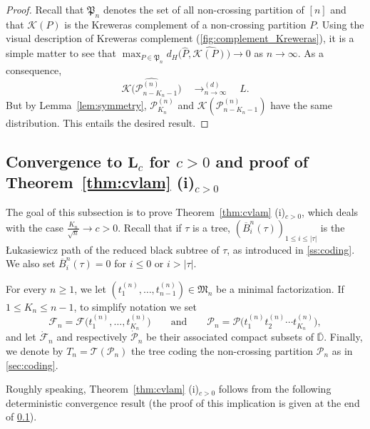 \documentclass[AHL,XML,longabstracts,Unicode]{cedram}
\newcommand{\D}{\mathbb{D}}
\def\PPP{\mathcal P}
\def\FFF{\mathcal F}
\def\dFn{\dot{\mathcal{F}}_{n}}
\def\dPn{\dot{\mathcal{P}}_{n}}
\def\oB{\overline{B}}
\begin{document}
\begin{proof}
Recall that $ \mathfrak{P}_{n}$ denotes the set of all non-crossing partition of $[n]$ and that $\mathcal{K}(P)$ is the Kreweras complement of a non-crossing partition $P$.
Using the visual description of Kreweras complement (\cref{fig:complement_Kreweras}),
it is a simple matter to see that $ \max_{P \in \mathfrak{P}_{n}} d_{H} \big(\hat{P}, \widehat{\mathcal{K}(P)} \big) \rightarrow 0$ as $n \rightarrow \infty$.  As a consequence,
    \[ \widehat{\mathcal{K} \big(\PPP^{(n)}_{n-K_{n}-1}\big)}    \quad \mathop{\longrightarrow}^{(d)}_{n \rightarrow \infty} \quad  L.\]
But by Lemma~\ref{lem:symmetry}, $\PPP^{(n)}_{K_{n}}$ and $\mathcal{K}( \PPP^{(n)}_{n-K_{n}-1})$ have the same distribution. This entails the desired result.
\end{proof}



\subsection{Convergence to \texorpdfstring{$\mathbf{L}_{c}$}{Lc} for \texorpdfstring{$c >0$}{c > 0}
and proof of Theorem~\ref{thm:cvlam} (i)\texorpdfstring{$_{c>0}$}{c > 0}}
\label{ssec:cv_pos}
The goal of this subsection is to prove Theorem~\ref{thm:cvlam} (i)$_{c>0}$,
which deals with the case $\tfrac{K_{n}}{\sqrt{n}} \rightarrow c>0$.
Recall that if $\tau$ is a tree, $(\oB^{n}_{i}(\tau))_{1 \leq i \leq |\tau|}$ is the {\L}ukasiewicz path of the reduced black subtree of $\tau$, as introduced in \cref{ss:coding}. We also set $\oB^{n}_{i}(\tau)=0$ for $i \leq 0$ or $i>|\tau|$.

For every $n \geq 1$, we let $(t_{1}^{(n)}, \ldots, t_{n-1}^{(n)}) \in \mathfrak{M}_{n}$  be a minimal factorization. If $1 \leq K_{n} \leq n-1$, to simplify notation we set
\[  \FFF_{n}= \FFF \big( t_{1}^{(n)}, \ldots, t_{K_{n}}^{(n)}\big) \qquad \text{and} \qquad \PPP_{n}= \PPP\big(  t_{1}^{(n)}  t_{2}^{(n)}  \cdots t_{K_{n}}^{(n)}\big),\]
and let $\dFn$ and respectively  $\dPn$ be their associated compact subsets of $\overline{\D}$.
Finally, we denote by $T_{n}= \mathcal{T}( \PPP_{n})$   the tree coding the non-crossing partition  $\PPP_{n}$ as in \cref{sec:coding}.

Roughly speaking,  Theorem~\ref{thm:cvlam} (i)$_{c>0}$ follows from the following deterministic convergence result
(the proof of this implication is given at the end of \cref{ssec:cv_pos}).
\end{document}
